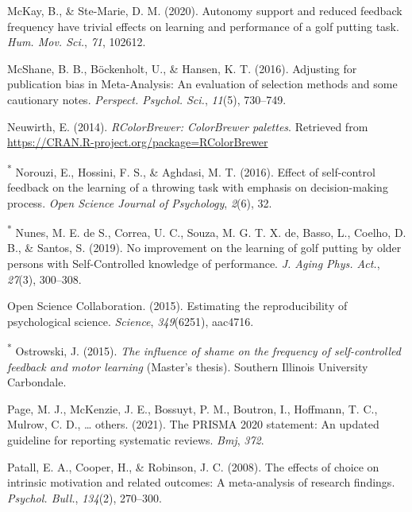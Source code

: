 \documentclass[
  english,
  man, donotrepeattitle,floatsintext]{apa7}
\newlength{\cslhangindent}
\newlength{\cslentryspacingunit} %
\newenvironment{CSLReferences}[2] %
 {%
  \setlength{\parindent}{0pt}
  \ifodd #1
  \let\oldpar\par
  \def\par{\hangindent=\cslhangindent\oldpar}
  \fi
  \setlength{\parskip}{#2\cslentryspacingunit}
 }%
 {}
\begin{document}
\begin{CSLReferences}{1}{0}
\leavevmode{}%
McKay, B., \& Ste-Marie, D. M. (2020). Autonomy support and reduced feedback frequency have trivial effects on learning and performance of a golf putting task. \emph{Hum. Mov. Sci.}, \emph{71}, 102612.

\leavevmode{}%
McShane, B. B., Böckenholt, U., \& Hansen, K. T. (2016). Adjusting for publication bias in {Meta-Analysis}: An evaluation of selection methods and some cautionary notes. \emph{Perspect. Psychol. Sci.}, \emph{11}(5), 730--749.

\leavevmode{}%
Neuwirth, E. (2014). \emph{RColorBrewer: ColorBrewer palettes}. Retrieved from \url{https://CRAN.R-project.org/package=RColorBrewer}

\leavevmode{}%
\textsuperscript{*} Norouzi, E., Hossini, F. S., \& Aghdasi, M. T. (2016). Effect of self-control feedback on the learning of a throwing task with emphasis on decision-making process. \emph{Open Science Journal of Psychology}, \emph{2}(6), 32.

\leavevmode{}%
\textsuperscript{*} Nunes, M. E. de S., Correa, U. C., Souza, M. G. T. X. de, Basso, L., Coelho, D. B., \& Santos, S. (2019). No improvement on the learning of golf putting by older persons with {Self-Controlled} knowledge of performance. \emph{J. Aging Phys. Act.}, \emph{27}(3), 300--308.

\leavevmode{}%
Open Science Collaboration. (2015). Estimating the reproducibility of psychological science. \emph{Science}, \emph{349}(6251), aac4716.

\leavevmode{}%
\textsuperscript{*} Ostrowski, J. (2015). \emph{The influence of shame on the frequency of self-controlled feedback and motor learning} (Master's thesis). Southern Illinois University Carbondale.

\leavevmode{}%
Page, M. J., McKenzie, J. E., Bossuyt, P. M., Boutron, I., Hoffmann, T. C., Mulrow, C. D., \ldots{} others. (2021). The PRISMA 2020 statement: An updated guideline for reporting systematic reviews. \emph{Bmj}, \emph{372}.

\leavevmode{}%
Patall, E. A., Cooper, H., \& Robinson, J. C. (2008). The effects of choice on intrinsic motivation and related outcomes: A meta-analysis of research findings. \emph{Psychol. Bull.}, \emph{134}(2), 270--300.


\end{CSLReferences}
\end{document}
